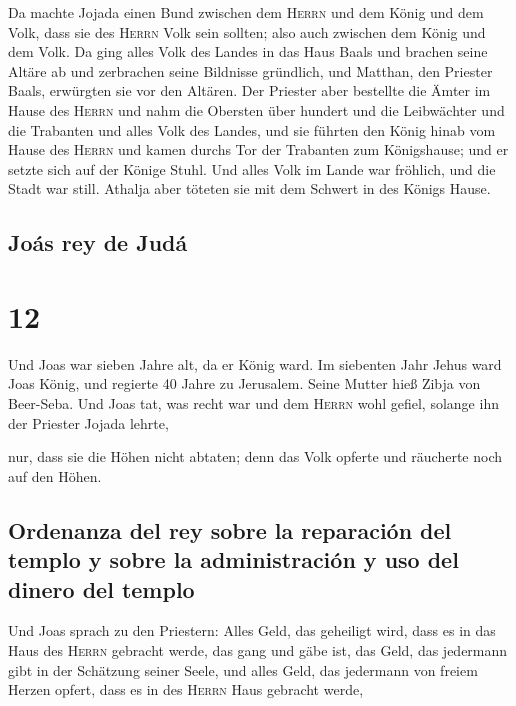  Da machte Jojada einen Bund zwischen dem \textsc{Herrn}
und dem König und dem Volk, dass sie des \textsc{Herrn} Volk sein
sollten; also auch zwischen dem König und dem Volk.  Da
ging alles Volk des Landes in das Haus Baals und brachen seine Altäre ab
und zerbrachen seine Bildnisse gründlich, und Matthan, den Priester
Baals, erwürgten sie vor den Altären. Der Priester aber bestellte die
Ämter im Hause des \textsc{Herrn}  und nahm die Obersten
über hundert und die Leibwächter und die Trabanten und alles Volk des
Landes, und sie führten den König hinab vom Hause des \textsc{Herrn} und
kamen durchs Tor der Trabanten zum Königshause; und er setzte sich auf
der Könige Stuhl.  Und alles Volk im Lande war fröhlich,
und die Stadt war still. Athalja aber töteten sie mit dem Schwert in des
Königs Hause.

\hypertarget{jouxe1s-rey-de-juduxe1}{%
\subsection{Joás rey de Judá}\label{jouxe1s-rey-de-juduxe1}}

\hypertarget{section-11}{%
\section{12}\label{section-11}}

 Und Joas war sieben Jahre alt, da er König ward.
 Im siebenten Jahr Jehus ward Joas König, und regierte 40
Jahre zu Jerusalem. Seine Mutter hieß Zibja von Beer-Seba.
 Und Joas tat, was recht war und dem \textsc{Herrn} wohl
gefiel, solange ihn der Priester Jojada lehrte,

 nur, dass sie die Höhen nicht abtaten; denn das Volk
opferte und räucherte noch auf den Höhen.

\hypertarget{ordenanza-del-rey-sobre-la-reparaciuxf3n-del-templo-y-sobre-la-administraciuxf3n-y-uso-del-dinero-del-templo}{%
\subsection{Ordenanza del rey sobre la reparación del templo y sobre la
administración y uso del dinero del
templo}\label{ordenanza-del-rey-sobre-la-reparaciuxf3n-del-templo-y-sobre-la-administraciuxf3n-y-uso-del-dinero-del-templo}}

 Und Joas sprach zu den Priestern: Alles Geld, das
geheiligt wird, dass es in das Haus des \textsc{Herrn} gebracht werde,
das gang und gäbe ist, das Geld, das jedermann gibt in der Schätzung
seiner Seele, und alles Geld, das jedermann von freiem Herzen opfert,
dass es in des \textsc{Herrn} Haus gebracht werde,

